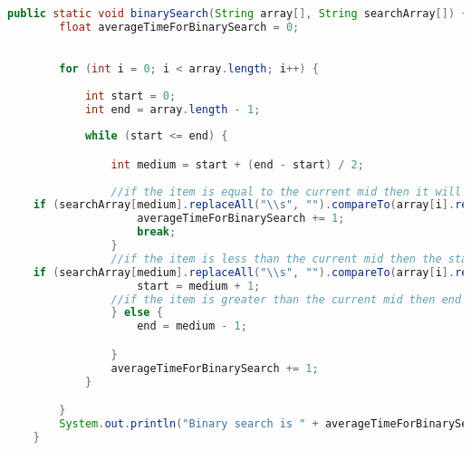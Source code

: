 \documentclass{article}
\begin{document}
\begin{lstlisting}[language = java]

public static void binarySearch(String array[], String searchArray[]) {
        float averageTimeForBinarySearch = 0;
       

        for (int i = 0; i < array.length; i++) {
            
            int start = 0;
            int end = array.length - 1;
            
            while (start <= end) {

                int medium = start + (end - start) / 2;
                
                //if the item is equal to the current mid then it will break out of the while loop
    if (searchArray[medium].replaceAll("\\s", "").compareTo(array[i].replaceAll("\\s", "")) == 0) {
                    averageTimeForBinarySearch += 1;
                    break;
                }
                //if the item is less than the current mid then the start becomes the medium plus 1
    if (searchArray[medium].replaceAll("\\s", "").compareTo(array[i].replaceAll("\\s", "")) < 0) {
                    start = medium + 1;
                //if the item is greater than the current mid then end becomes the medium - 1
                } else {
                    end = medium - 1;

                }
                averageTimeForBinarySearch += 1;
            }

        }
        System.out.println("Binary search is " + averageTimeForBinarySearch /42);
    }
\end{lstlisting}
\end{document}
